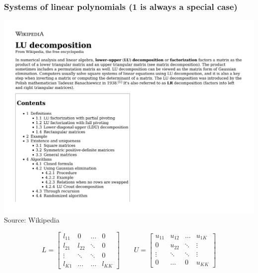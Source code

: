 \documentclass{beamer}
\begin{document}
\begin{frame}
\frametitle{Systems of linear polynomials (1 is always a special case)}
\includegraphics[clip, trim=0in 5.4in 0in 0.5in, width=\textwidth, page=13]{LU decomposition - Wikipedia.pdf}
{\tiny Source: Wikipedia}

\[
L = \begin{bmatrix} 
    l_{11} & 0 & \dots & 0 \\
    l_{21} & l_{22} & \ddots & 0 \\
    \vdots & \ddots & \ddots & 0 \\
    l_{K1} & \dots  & \dots & l_{KK} 
    \end{bmatrix}
\qquad
U = \begin{bmatrix} 
    u_{11} & u_{12} & \dots  & u_{1K}\\
         0 & u_{22} & \ddots & \vdots\\
    \vdots & \ddots & \ddots & \vdots\\
         0 & \dots  &    0   & u_{KK} 
    \end{bmatrix}
\]
\end{frame}
\end{document}
